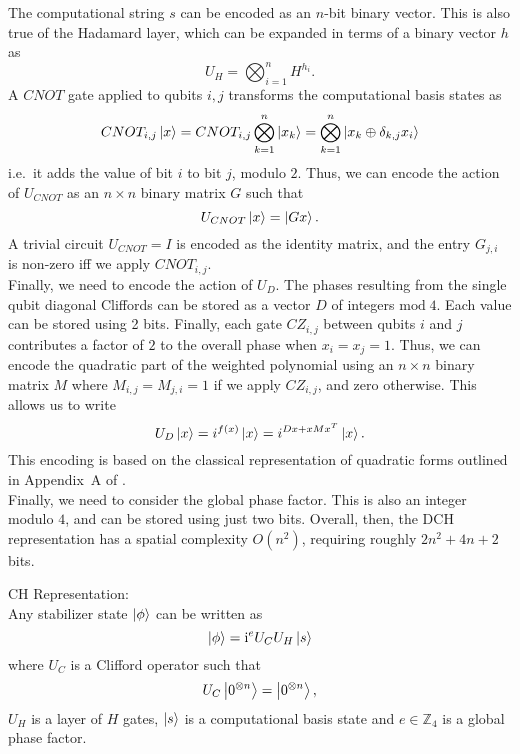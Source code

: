 The computational string $s$ can be encoded as an $n$-bit binary vector. This is also true of the Hadamard layer, which can be expanded in terms of a binary vector $h$ as
\begin{equation}
U_{H} = \bigotimes_{i=1}^{n} H^{h_{i}}.
\label{eq:binaryhad}
\end{equation}
A $CNOT$ gate applied to qubits $i,j$ transforms the computational basis states as
\begin{equation}
CNOT_{i,j}\ket{x} = CNOT_{i,j}\bigotimes_{k=1}^{n}\ket{x_{k}} = \bigotimes_{k=1}^{n}\ket{x_{k}\oplus\delta_{k,j}x_{i}}
\end{equation}
i.e.~it adds the value of bit $i$ to bit $j$, modulo $2$. Thus, we can encode the action of $U_{CNOT}$ as an $n\times n$ binary matrix $G$ such that
\begin{equation}
U_{CNOT}\ket{x} = \ket{Gx}.
\end{equation}
A trivial circuit $U_{CNOT}=I$ is encoded as the identity matrix, and the entry $G_{j,i}$ is non-zero iff we apply $CNOT_{i,j}$.\\
Finally, we need to encode the action of $U_{D}$. The phases resulting from the single qubit diagonal Cliffords can be stored as a vector $D$ of integers $\text{mod}\;4$. Each value can be stored using 2 bits. Finally, each gate $CZ_{i,j}$ between qubits $i$ and $j$ contributes a factor of $2$ to the overall phase when $x_{i}=x_{j}=1$. Thus, we can encode the quadratic part of the weighted polynomial using an $n\times n$ binary matrix $M$ where $M_{i,j}=M_{j,i}=1$ if we apply $CZ_{i,j}$, and zero otherwise. This allows us to write
\begin{equation}
U_{D}\ket{x} = i^{f(x)}\ket{x} = i^{Dx + xMx^{T}}\ket{x}.
\end{equation}
This encoding is based on the classical representation of quadratic forms outlined in Appendix~A of \cite{Bravyi2016}.\\
Finally, we need to consider the global phase factor. This is also an integer modulo $4$, and can be stored using just two bits. Overall, then, the DCH representation has a spatial complexity $O(n^{2})$, requiring roughly $2n^{2}+4n+2$ bits.
\begin{defn}
CH Representation:\\
Any stabilizer state $\ket{\phi}$ can be written as
\begin{equation}
\ket{\phi} = \mathrm{i}^{e} U_{C}U_{H}\ket{s}
\label{eq:ch}
\end{equation}
where $U_{C}$ is a Clifford operator such that
\begin{equation}
U_{C}\ket{0^{\otimes n}} = \ket{0^{\otimes n}},
\end{equation}
$U_{H}$ is a layer of $H$ gates, $\ket{s}$ is a computational basis state and $e\in\mathbb{Z}_{4}$ is a global phase factor.
\label{def:ch}
\end{defn}
